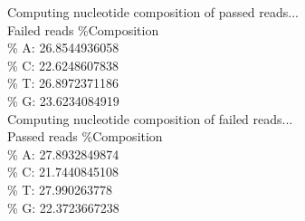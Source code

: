Computing nucleotide composition of passed reads...\\
Failed reads \%Composition\\
\% A: 26.8544936058\\
\% C: 22.6248607838\\
\% T: 26.8972371186\\
\% G: 23.6234084919\\
Computing nucleotide composition of failed reads...\\
Passed reads \%Composition\\
\% A: 27.8932849874\\
\% C: 21.7440845108\\
\% T: 27.990263778\\
\% G: 22.3723667238\\
